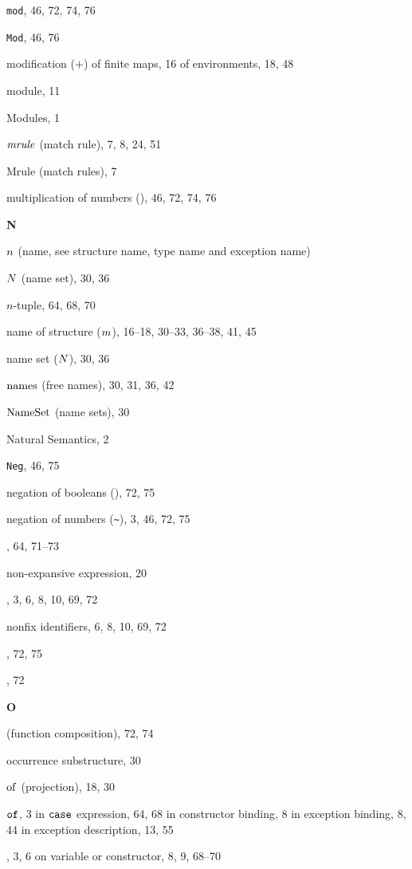 \begin{theindex}
\item {\tt mod}, 46, 72, 74, 76
\item {\tt Mod}, 46, 76
\item modification ($+$) 
\subitem of finite maps, 16
\subitem of environments, 18, 48
\item module, 11
\item Modules, 1
\item ${\it mrule}$ (match rule), 7, 8, 24, 51
\item Mrule (match rules), 7
\item multiplication of numbers (\ml{*}), 46, 72, 74, 76
\indexspace
\parbox{65mm}{\hfil{\large\bf N}\hfil}
\indexspace
\item $n$ (name, see structure name, type name and exception name) 
\item $N$ (name set), 30, 36
\item $n$-tuple, 64, 68, 70
\item name 
\subitem of structure ($m$), 16--18, 30--33, 36--38, 41, 45
\item name set ($N$), 30, 36
\item $\mathop{\rm names}\nolimits$ (free names), 30, 31, 36, 42
\item ${\rm NameSet}$ (name sets), 30
\item Natural Semantics, 2
\item {\tt Neg}, 46, 75
\item negation of booleans (), 72, 75
\item negation of numbers (\verb+~+), 3, 46, 72, 75
\item \NIL, 64, 71--73
\item non-expansive expression, 20
\item \NONFIX, 3, 6, 8, 10, 69, 72
\item nonfix identifiers, 6, 8, 10, 69, 72
\item {}, 72, 75
\item \NUM, 72
\indexspace
\parbox{65mm}{\hfil{\large\bf O}\hfil}
\indexspace
\item {} (function composition), 72, 74
\item occurrence 
\subitem substructure, 30
\item $\mathbin{\rm of}$ (projection), 18, 30
\item ${\tt of}$, 3
\subitem in ${\tt case}$ expression, 64, 68
\subitem in constructor binding, 8
\subitem in exception binding, 8, 44
\subitem in exception description, 13, 55
\item \OP, 3, 6
\subitem on variable or constructor, 8, 9, 68--70

\end{theindex}
